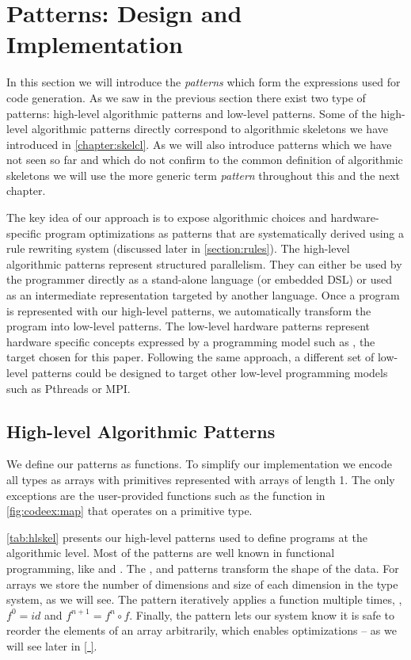 \section{Patterns: Design and Implementation}
\label{section:patterns}

In this section we will introduce the \emph{patterns} which form the expressions used for code generation.
As we saw in the previous section there exist two type of patterns: high-level algorithmic patterns and low-level \OpenCL patterns.
Some of the high-level algorithmic patterns directly correspond to algorithmic skeletons we have introduced in \autoref{chapter:skelcl}.
As we will also introduce patterns which we have not seen so far and which do not confirm to the common definition of algorithmic skeletons we will use the more generic term \emph{pattern} throughout this and the next chapter.

The key idea of our approach is to expose algorithmic choices and hardware-specific program optimizations as patterns that are systematically derived using a rule rewriting system (discussed later in \autoref{section:rules}).
The high-level algorithmic patterns represent structured parallelism.
They can either be used by the programmer directly as a stand-alone language (or embedded DSL) or used as an intermediate representation targeted by another language.
Once a program is represented with our high-level patterns, we automatically transform the program into low-level patterns.
The low-level hardware patterns represent hardware specific concepts expressed by a programming model such as \OpenCL, the target chosen for this paper.
Following the same approach, a different set of low-level patterns could be designed to target other low-level programming models such as Pthreads or MPI.


\subsection{High-level Algorithmic Patterns}

We define our patterns as functions.
To simplify our implementation we encode all types as arrays with primitives represented with arrays of length 1.
The only exceptions are the user-provided functions such as the  function in \autoref{fig:codeex:map} that operates on a primitive type.

\autoref{tab:hlskel} presents our high-level patterns used to define programs at the algorithmic level.
Most of the patterns are well known in functional programming, like  and .
The ,  and  patterns transform the shape of the data.
For arrays we store the number of dimensions and size of each dimension in the type system, as we will see.
The  pattern iteratively applies a function multiple times, \ie, {$f^0 = id$} and {$f^{n+1} = f^n \circ f$}.
Finally, the  pattern lets our system know it is safe to reorder the elements of an array arbitrarily, which enables optimizations -- as we will see later in \autoref{ }.

